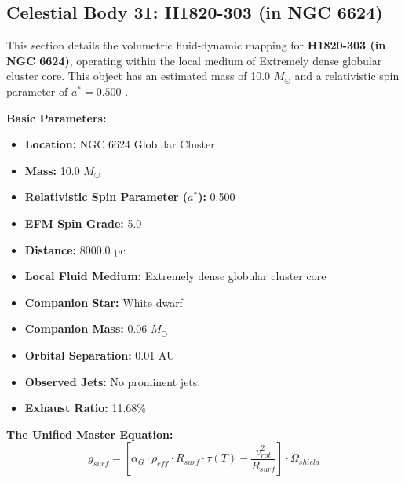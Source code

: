 \documentclass[11pt, a4paper]{article}
\begin{document}
\clearpage
\subsection{Celestial Body 31: H1820-303 (in NGC 6624)}
This section details the volumetric fluid-dynamic mapping for \textbf{H1820-303 (in NGC 6624)}, operating within the local medium of Extremely dense globular cluster core. This object has an estimated mass of 10.0 $M_{\odot}$ and a relativistic spin parameter of $a^* = 0.500$ \cite{stella1987, simbad}.

\vspace{0.5em}
\noindent \textbf{Basic Parameters:}
\begin{itemize}
  \item \textbf{Location:} NGC 6624 Globular Cluster
  \item \textbf{Mass:} 10.0 $M_{\odot}$
  \item \textbf{Relativistic Spin Parameter ($a^*$):} 0.500
  \item \textbf{EFM Spin Grade:} 5.0
  \item \textbf{Distance:} 8000.0 pc
  \item \textbf{Local Fluid Medium:} Extremely dense globular cluster core
  \item \textbf{Companion Star:} White dwarf
  \item \textbf{Companion Mass:} 0.06 $M_{\odot}$
  \item \textbf{Orbital Separation:} 0.01 AU
  \item \textbf{Observed Jets:} No prominent jets.
  \item \textbf{Exhaust Ratio:} 11.68\%
\end{itemize}

\vspace{0.5em}
\noindent \textbf{The Unified Master Equation:}
$$ g_{surf} = \left[ \alpha_G \cdot \rho_{eff} \cdot R_{surf} \cdot \tau(T) - \frac{v_{rot}^2}{R_{surf}} \right] \cdot \Omega_{shield} $$
\end{document}
